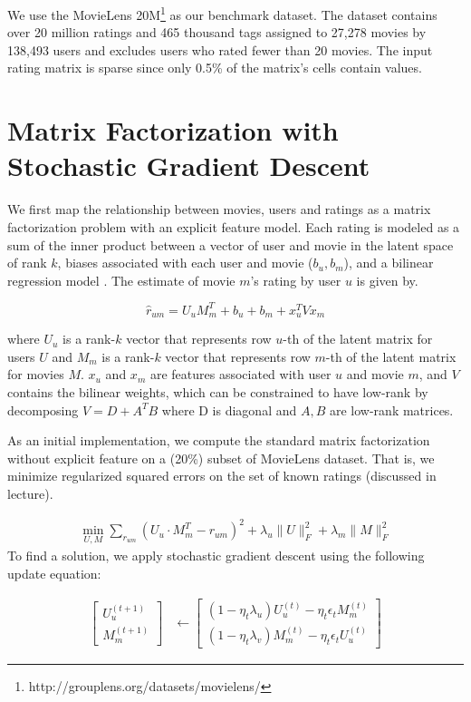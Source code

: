 \documentclass{article} %
\newcommand{\U}{U}
\newcommand{\M}{M}
\begin{document}
We use the MovieLens 20M\footnote{http://grouplens.org/datasets/movielens/}
as our benchmark dataset.  The dataset contains over 20 million ratings and 465 thousand tags assigned to 27,278 movies by 138,493 users and excludes users who rated fewer than 20 movies. The input rating matrix is sparse since only 0.5\% of the matrix's cells contain values.




\section{Matrix Factorization with Stochastic Gradient Descent}

We first map the relationship between movies, users and ratings
as a matrix factorization problem with an explicit feature model.
Each rating is modeled as a sum of the inner product between a vector of user and movie in the latent space of rank $k$, biases associated with each user and movie ($b_u, b_m$), and a bilinear regression model \cite{gabriel1998generalised}. The estimate of movie $m$'s rating by user $u$ is given by.

\[
  \hat{r}_{um} = \U_u \M_m^T + b_u + b_m + x_u^T V x_m
  \label{eq:estimate}
\]

where $\U_u$ is a rank-$k$ vector that represents row $u$-th of the latent matrix for users $\U$ and $\M_m$ is a rank-$k$ vector that represents row $m$-th of the latent matrix for movies $\M$. $x_u$ and $x_m$ are features associated with user $u$ and movie $m$, and $V$ contains the bilinear weights, which can be constrained to have low-rank by decomposing $V=D + A^TB$ where D is diagonal and $A,B$ are low-rank matrices.

As an initial implementation, we compute the standard matrix factorization without explicit feature on a (20\%) subset of MovieLens dataset. That is, we minimize regularized squared errors on the set of known ratings (discussed in lecture).

\begin{align}
  \min_{\U,\M} \sum_{r_{um}} (\U_u \cdot \M_m^T - r_{um})^2
  + \lambda_u \|\U\|^2_F + \lambda_m \|\M\|^2_F
\end{align}
To find a solution, we apply stochastic gradient descent using the following update equation:

\begin{align}
\left[\begin{array}{c}
\U_u^{(t+1)}
\\
\M_m^{(t+1)}
\end{array}\right]
& \leftarrow
\left[\begin{array}{c}
(1-\eta_t \lambda_u) \U_u^{(t)} - \eta_t \epsilon_t \M_m^{(t)}
\\
(1-\eta_t \lambda_v) \M_m^{(t)} - \eta_t \epsilon_t \U_u^{(t)}
\end{array}\right]
\label{eq:update}
\end{align}
\end{document}
